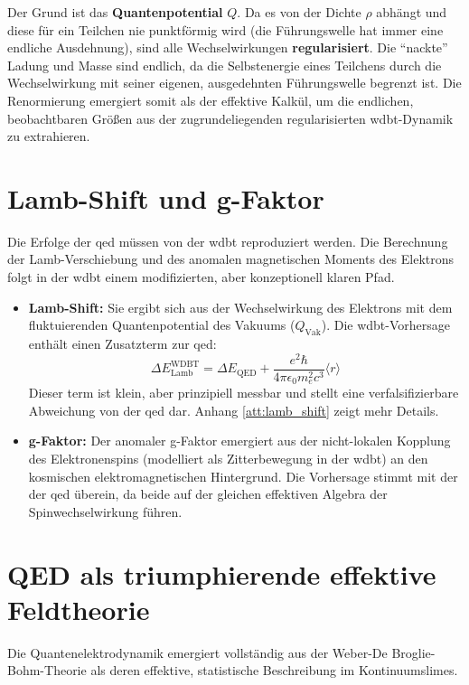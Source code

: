 Der Grund ist das \textbf{Quantenpotential} $Q$. Da es von der Dichte $\rho$ abhängt und diese für ein Teilchen nie punktförmig wird (die Führungswelle hat immer eine endliche Ausdehnung), sind alle
Wechselwirkungen \textbf{regularisiert}. Die \enquote{nackte} Ladung und Masse sind endlich, da die Selbstenergie eines Teilchens durch die Wechselwirkung mit seiner eigenen, ausgedehnten Führungswelle
begrenzt ist. Die Renormierung emergiert somit als der effektive Kalkül, um die endlichen, beobachtbaren Größen aus der zugrundeliegenden regularisierten \gls{wdbt}-Dynamik zu extrahieren.

\section{Lamb-Shift und g-Faktor}
Die Erfolge der \gls{qed} müssen von der \gls{wdbt} reproduziert werden. Die Berechnung der Lamb-Verschiebung und des anomalen magnetischen Moments des Elektrons folgt in der \gls{wdbt} einem
modifizierten, aber konzeptionell klaren Pfad.

\begin{itemize}
    \item \textbf{Lamb-Shift:} Sie ergibt sich aus der Wechselwirkung des Elektrons mit dem fluktuierenden Quantenpotential des Vakuums ($Q_\text{Vak}$). Die \gls{wdbt}-Vorhersage enthält einen Zusatzterm zur \gls{qed}:
    \begin{equation}
        \label{eq:lamb_shift}
        \Delta E_{\text{Lamb}}^{\text{WDBT}} = \Delta E_{\text{QED}} + \frac{e^2 \hbar}{4\pi \epsilon_0 m_e^2 c^3} \langle r \rangle
    \end{equation}
    Dieser term ist klein, aber prinzipiell messbar und stellt eine verfalsifizierbare Abweichung von der \gls{qed} dar. Anhang \ref{att:lamb_shift} zeigt mehr Details.
    \item \textbf{g-Faktor:} Der anomaler g-Faktor emergiert aus der nicht-lokalen Kopplung des Elektronenspins (modelliert als Zitterbewegung in der \gls{wdbt}) an den kosmischen elektromagnetischen Hintergrund. Die Vorhersage stimmt mit der der \gls{qed} überein, da beide auf der gleichen effektiven Algebra der Spinwechselwirkung führen.
\end{itemize}

\section{QED als triumphierende effektive Feldtheorie}
Die Quantenelektrodynamik emergiert vollständig aus der Weber-De Broglie-Bohm-Theorie als deren effektive, statistische Beschreibung im Kontinuumslimes.

